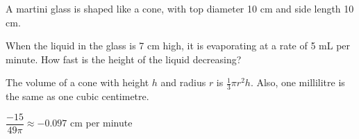 \begin{Mquestion}\label{s3.2formulaslast}
A martini glass is shaped like a cone, with top diameter 10 cm and side length 10 cm.
\begin{center}\end{center}
When the liquid in the glass is 7 cm high, it is evaporating at a rate of 5 mL per minute. How fast is the height of the liquid decreasing?
\end{Mquestion}
\begin{hint}
The volume of a cone with height $h$ and radius $r$ is $\frac{1}{3}\pi r^2h$.
Also, one millilitre is the same as one cubic centimetre.
\end{hint}
\begin{answer}
$\dfrac{-15}{49\pi}\approx -0.097$  cm per minute
\end{answer}
